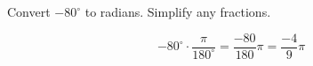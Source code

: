 Convert $-80^{\circ}$ to radians. Simplify any fractions.

$$
-80^{\circ} \cdot \frac{\pi}{180^{\circ}} = \frac{-80}{180} \pi = \frac{-4}{9} \pi
$$
